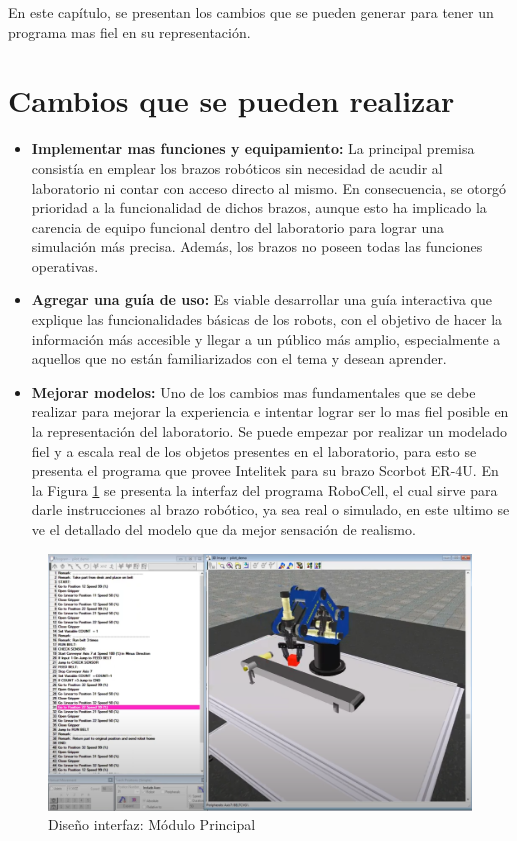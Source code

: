En este capítulo, se presentan los cambios que se pueden generar para tener un programa mas fiel en su representación.
\section{Cambios que se pueden realizar}
\begin{itemize}
    \item \textbf{Implementar mas funciones y equipamiento:} La principal premisa consistía en emplear los brazos robóticos sin necesidad de acudir al laboratorio ni contar con acceso directo al mismo. En consecuencia, se otorgó prioridad a la funcionalidad de dichos brazos, aunque esto ha implicado la carencia de equipo funcional dentro del laboratorio para lograr una simulación más precisa. Además, los brazos no poseen todas las funciones operativas.
    \item \textbf{Agregar una guía de uso:} Es viable desarrollar una guía interactiva que explique las funcionalidades básicas de los robots, con el objetivo de hacer la información más accesible y llegar a un público más amplio, especialmente a aquellos que no están familiarizados con el tema y desean aprender.
    \item \textbf{Mejorar modelos:} Uno de los cambios mas fundamentales que se debe realizar para mejorar la experiencia e intentar lograr ser lo mas fiel posible en la representación del laboratorio.
    Se puede empezar por realizar un modelado fiel y a escala real de los objetos presentes en el laboratorio, para esto se presenta el programa que provee Intelitek para su brazo Scorbot ER-4U.
    En la Figura \ref{fig:modelo} se presenta la interfaz del programa RoboCell, el cual sirve para darle instrucciones al brazo robótico, ya sea real o simulado, en este ultimo se ve el detallado del modelo que da mejor sensación de realismo.
\end{itemize}
\clearpage
\begin{figure}[h]
\centering
\includegraphics[width=13cm]{figures/modelo.png}
\caption{Diseño interfaz: Módulo Principal}
\label{fig:modelo}
\end{figure}
